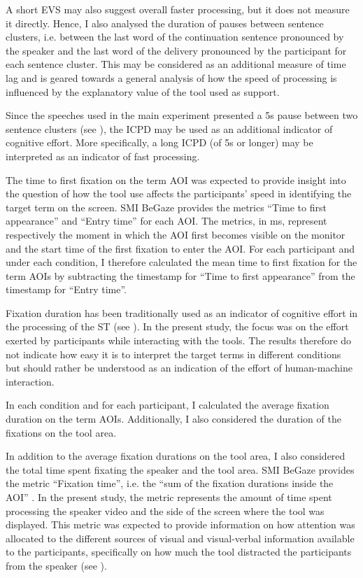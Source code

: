 A short EVS may also suggest overall faster processing, but it does not measure it directly. Hence, I also analysed the duration of pauses between sentence clusters, i.e. between the last word of the continuation sentence pronounced by the speaker and the last word of the delivery pronounced by the participant for each sentence cluster. This may be considered as an additional measure of time lag and is geared towards a general analysis of how the speed of processing is influenced by the explanatory value of the tool used as support.

Since the speeches used in the main experiment presented a 5s pause between two sentence clusters (see ), the ICPD may be used as an additional indicator of cognitive effort. More specifically, a long ICPD (of 5s or longer) may be interpreted as an indicator of fast processing.

The time to first fixation on the term AOI was expected to provide insight into the question of how the tool use affects the participants' speed in identifying the target term on the screen.
SMI BeGaze provides the metrics ``Time to first appearance'' and ``Entry time'' for each AOI. The metrics, in ms, represent respectively the moment in which the AOI first becomes visible on the monitor and the start time of the first fixation to enter the AOI. For each participant and under each condition, I therefore calculated the mean time to first fixation for the term AOIs by subtracting the timestamp for ``Time to first appearance'' from the timestamp for ``Entry time''.

Fixation duration has been traditionally used as an indicator of cognitive effort in the processing of the ST (see ). In the present study, the focus was on the effort exerted by participants while interacting with the tools. The results therefore do not indicate how easy it is to interpret the target terms in different conditions but should rather be understood as an indication of the effort of human-machine interaction.

In each condition and for each participant, I calculated the average fixation duration on the term AOIs. Additionally, I also considered the duration of the fixations on the tool area.

In addition to the average fixation durations on the tool area, I also considered the total time spent fixating the speaker and the tool area. SMI BeGaze provides the metric ``Fixation time'', i.e. the ``sum of the fixation durations inside the AOI'' \citep[370]{begaze_2017}. In the present study, the metric represents the amount of time spent processing the speaker video and the side of the screen where the tool was displayed. This metric was expected to provide information on how attention was allocated to the different sources of visual and visual-verbal information available to the participants, specifically on how much the tool distracted the participants from the speaker (see ).

